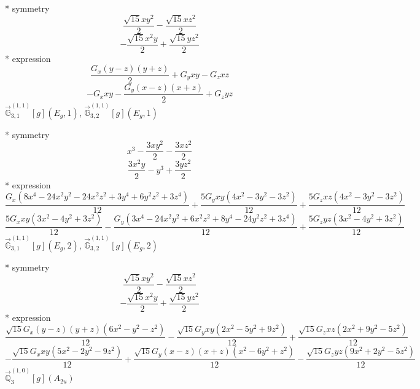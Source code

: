 \documentclass[fleqn,8pt]{jsarticle}
\begin{document}
\noindent\quad ** symmetry
\begin{dmath*}
\frac{\sqrt{15} x y^{2}}{2} - \frac{\sqrt{15} x z^{2}}{2}
\end{dmath*}
\begin{dmath*}
- \frac{\sqrt{15} x^{2} y}{2} + \frac{\sqrt{15} y z^{2}}{2}
\end{dmath*}
\noindent\quad ** expression
\begin{dmath*}
\frac{G_{x} \left(y - z\right) \left(y + z\right)}{2} + G_{y} x y - G_{z} x z
\end{dmath*}
\begin{dmath*}
- G_{x} x y - \frac{G_{y} \left(x - z\right) \left(x + z\right)}{2} + G_{z} y z
\end{dmath*}
\noindent\quad $\vec{\mathbb{G}}_{3,1}^{(1,1)}[g](E_{g},1)$, $\vec{\mathbb{G}}_{3,2}^{(1,1)}[g](E_{g},1)$

\noindent\quad ** symmetry
\begin{dmath*}
x^{3} - \frac{3 x y^{2}}{2} - \frac{3 x z^{2}}{2}
\end{dmath*}
\begin{dmath*}
\frac{3 x^{2} y}{2} - y^{3} + \frac{3 y z^{2}}{2}
\end{dmath*}
\noindent\quad ** expression
\begin{dmath*}
\frac{G_{x} \left(8 x^{4} - 24 x^{2} y^{2} - 24 x^{2} z^{2} + 3 y^{4} + 6 y^{2} z^{2} + 3 z^{4}\right)}{12} + \frac{5 G_{y} x y \left(4 x^{2} - 3 y^{2} - 3 z^{2}\right)}{12} + \frac{5 G_{z} x z \left(4 x^{2} - 3 y^{2} - 3 z^{2}\right)}{12}
\end{dmath*}
\begin{dmath*}
\frac{5 G_{x} x y \left(3 x^{2} - 4 y^{2} + 3 z^{2}\right)}{12} - \frac{G_{y} \left(3 x^{4} - 24 x^{2} y^{2} + 6 x^{2} z^{2} + 8 y^{4} - 24 y^{2} z^{2} + 3 z^{4}\right)}{12} + \frac{5 G_{z} y z \left(3 x^{2} - 4 y^{2} + 3 z^{2}\right)}{12}
\end{dmath*}
\noindent\quad $\vec{\mathbb{G}}_{3,1}^{(1,1)}[g](E_{g},2)$, $\vec{\mathbb{G}}_{3,2}^{(1,1)}[g](E_{g},2)$

\noindent\quad ** symmetry
\begin{dmath*}
\frac{\sqrt{15} x y^{2}}{2} - \frac{\sqrt{15} x z^{2}}{2}
\end{dmath*}
\begin{dmath*}
- \frac{\sqrt{15} x^{2} y}{2} + \frac{\sqrt{15} y z^{2}}{2}
\end{dmath*}
\noindent\quad ** expression
\begin{dmath*}
\frac{\sqrt{15} G_{x} \left(y - z\right) \left(y + z\right) \left(6 x^{2} - y^{2} - z^{2}\right)}{12} - \frac{\sqrt{15} G_{y} x y \left(2 x^{2} - 5 y^{2} + 9 z^{2}\right)}{12} + \frac{\sqrt{15} G_{z} x z \left(2 x^{2} + 9 y^{2} - 5 z^{2}\right)}{12}
\end{dmath*}
\begin{dmath*}
- \frac{\sqrt{15} G_{x} x y \left(5 x^{2} - 2 y^{2} - 9 z^{2}\right)}{12} + \frac{\sqrt{15} G_{y} \left(x - z\right) \left(x + z\right) \left(x^{2} - 6 y^{2} + z^{2}\right)}{12} - \frac{\sqrt{15} G_{z} y z \left(9 x^{2} + 2 y^{2} - 5 z^{2}\right)}{12}
\end{dmath*}
\noindent\quad $\vec{\mathbb{Q}}_{3}^{(1,0)}[g](A_{2u})$
\end{document}
